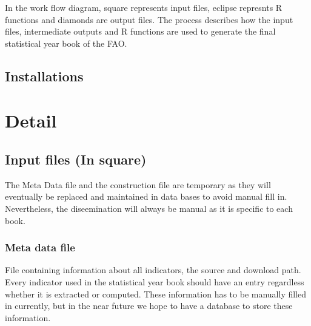 \documentclass{article}\usepackage{graphicx, color}
\begin{document}
In the work flow diagram, square represents input files, eclipse
represnts R functions and diamonds are output files. The process
describes how the input files, intermediate outputs and R functions are
used to generate the final statistical year book of the FAO.

\subsection{Installations}

\section{Detail}
\subsection{Input files (In square)}
The Meta Data file and the construction file are temporary as they will
eventually be replaced and maintained in data bases to avoid manual fill
in. Nevertheless, the diseemination will always be manual as it is
specific to each book.

\subsubsection{Meta data file}
File containing information about all indicators, the source and download
path. Every indicator used in the statistical year book should have an
entry regardless whether it is extracted or computed. These information
has to be manually filled in currently, but in the near future we hope
to have a database to store these information.
\end{document}
